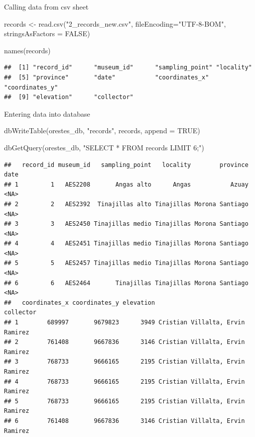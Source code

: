 \documentclass[
]{book}
\newenvironment{Shaded}{\begin{snugshade}}{\end{snugshade}}
\newcommand{\AttributeTok}[1]{\textcolor[rgb]{0.77,0.63,0.00}{#1}}
\newcommand{\ConstantTok}[1]{\textcolor[rgb]{0.00,0.00,0.00}{#1}}
\newcommand{\FunctionTok}[1]{\textcolor[rgb]{0.00,0.00,0.00}{#1}}
\newcommand{\NormalTok}[1]{#1}
\newcommand{\OtherTok}[1]{\textcolor[rgb]{0.56,0.35,0.01}{#1}}
\newcommand{\StringTok}[1]{\textcolor[rgb]{0.31,0.60,0.02}{#1}}
\begin{document}
Calling data from csv sheet

\begin{Shaded}
\begin{Highlighting}[]
\NormalTok{records }\OtherTok{\textless{}{-}} \FunctionTok{read.csv}\NormalTok{(}\StringTok{"2\_records\_new.csv"}\NormalTok{, }\AttributeTok{fileEncoding=}\StringTok{"UTF{-}8{-}BOM"}\NormalTok{, }
                   \AttributeTok{stringsAsFactors =} \ConstantTok{FALSE}\NormalTok{) }

\FunctionTok{names}\NormalTok{(records)}
\end{Highlighting}
\end{Shaded}

\begin{verbatim}
##  [1] "record_id"      "museum_id"      "sampling_point" "locality"      
##  [5] "province"       "date"           "coordinates_x"  "coordinates_y" 
##  [9] "elevation"      "collector"
\end{verbatim}

Entering data into database

\begin{Shaded}
\begin{Highlighting}[]
\FunctionTok{dbWriteTable}\NormalTok{(orestes\_db, }\StringTok{"records"}\NormalTok{, records, }\AttributeTok{append =} \ConstantTok{TRUE}\NormalTok{)}

\FunctionTok{dbGetQuery}\NormalTok{(orestes\_db, }\StringTok{"SELECT * FROM records LIMIT 6;"}\NormalTok{)}
\end{Highlighting}
\end{Shaded}

\begin{verbatim}
##   record_id museum_id   sampling_point   locality        province date
## 1         1   AES2208       Angas alto      Angas           Azuay <NA>
## 2         2   AES2392  Tinajillas alto Tinajillas Morona Santiago <NA>
## 3         3   AES2450 Tinajillas medio Tinajillas Morona Santiago <NA>
## 4         4   AES2451 Tinajillas medio Tinajillas Morona Santiago <NA>
## 5         5   AES2457 Tinajillas medio Tinajillas Morona Santiago <NA>
## 6         6   AES2464       Tinajillas Tinajillas Morona Santiago <NA>
##   coordinates_x coordinates_y elevation                        collector
## 1        689997       9679823      3949 Cristian Villalta, Ervin Ramirez
## 2        761408       9667836      3146 Cristian Villalta, Ervin Ramirez
## 3        768733       9666165      2195 Cristian Villalta, Ervin Ramirez
## 4        768733       9666165      2195 Cristian Villalta, Ervin Ramirez
## 5        768733       9666165      2195 Cristian Villalta, Ervin Ramirez
## 6        761408       9667836      3146 Cristian Villalta, Ervin Ramirez
\end{verbatim}
\end{document}

